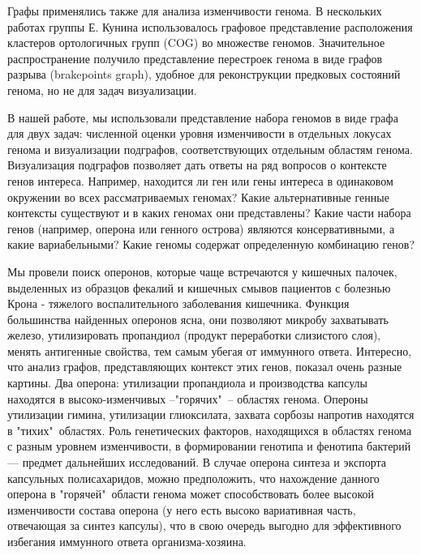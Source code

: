 Графы применялись также для анализа изменчивости генома. В нескольких работах группы Е. Кунина использовалось графовое представление расположения кластеров ортологичных групп (COG) во множестве геномов. Значительное распространение получило представление перестроек генома в виде графов разрыва (brakepoints graph), удобное для реконструкции предковых состояний генома, но не для задач визуализации. 

В нашей работе, мы использовали представление набора геномов в виде графа для двух задач: численной оценки уровня изменчивости в отдельных локусах генома и визуализации подграфов, соответствующих отдельным областям генома. Визуализация подграфов позволяет дать ответы на ряд вопросов о контексте генов интереса. Например, находится ли ген или гены интереса в одинаковом окружении во всех рассматриваемых геномах? Какие альтернативные генные контексты существуют и в каких геномах они представлены? Какие части набора генов (например, оперона или генного острова) являются консервативными, а какие вариабельными? Какие геномы содержат определенную комбинацию генов? 

Мы провели поиск оперонов, которые чаще встречаются у кишечных палочек, выделенных из образцов фекалий и кишечных смывов пациентов с болезнью Крона - тяжелого воспалительного заболевания кишечника. Функция большинства найденных оперонов ясна, они позволяют микробу захватывать железо, утилизировать пропандиол (продукт переработки слизистого слоя), менять антигенные свойства, тем самым убегая от иммунного ответа. Интересно, что анализ графов, представляющих контекст этих генов, показал очень разные картины. Два оперона: утилизации пропандиола и производства капсулы находятся в высоко-изменчивых --"горячих"\ -- областях генома. Опероны утилизации гимина, утилизации глиоксилата, захвата сорбозы напротив находятся в "тихих"\ областях. Роль генетических факторов, находящихся в областях генома с разным уровнем изменчивости, в формировании генотипа и фенотипа бактерий --- предмет дальнейших исследований. В случае оперона синтеза и экспорта капсульных полисахаридов, можно предположить, что нахождение данного оперона в "горячей"\ области генома может способствовать более высокой изменчивости состава оперона (у него есть высоко вариативная часть, отвечающая за синтез капсулы), что в свою очередь выгодно для эффективного избегания иммунного ответа организма-хозяина.

